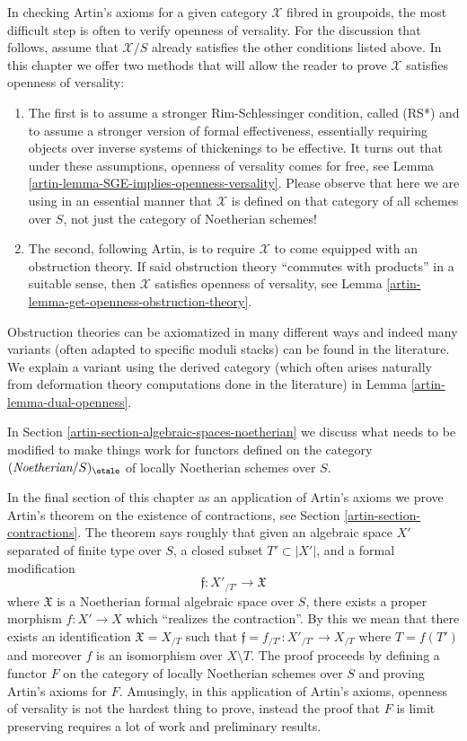\medskip\noindent
In checking Artin's axioms for a given category $\mathcal{X}$ fibred
in groupoids, the most difficult step is often to verify openness
of versality. For the discussion that follows, assume that $\mathcal{X}/S$
already satisfies the other conditions listed above.
In this chapter we offer two methods that will allow the reader
to prove $\mathcal{X}$ satisfies openness of versality:
\begin{enumerate}
\item The first is to assume a stronger Rim-Schlessinger
condition, called (RS*) and to assume a stronger version of
formal effectiveness, essentially requiring objects over
inverse systems of thickenings to be effective. It turns out
that under these assumptions, openness of versality comes for
free, see Lemma \ref{artin-lemma-SGE-implies-openness-versality}.
Please observe that here we are using in an essential manner
that $\mathcal{X}$ is defined on that category of all schemes
over $S$, not just the category of Noetherian schemes!
\item The second, following Artin, is to require $\mathcal{X}$
to come equipped with an obstruction theory. If said obstruction
theory ``commutes with products'' in a suitable sense, then
$\mathcal{X}$ satisfies openness of versality, see
Lemma \ref{artin-lemma-get-openness-obstruction-theory}.
\end{enumerate}
Obstruction theories can be axiomatized in many different ways
and indeed many variants (often adapted to specific moduli stacks)
can be found in the literature. We explain a variant using the derived category
(which often arises naturally from deformation theory computations
done in the literature) in Lemma \ref{artin-lemma-dual-openness}.

\medskip\noindent
In Section \ref{artin-section-algebraic-spaces-noetherian}
we discuss what needs to be modified to make
things work for functors defined on the category
$(\textit{Noetherian}/S)_\etale$ of locally Noetherian
schemes over $S$.

\medskip\noindent
In the final section of this chapter as an application of Artin's axioms
we prove Artin's theorem on the existence of contractions, see
Section \ref{artin-section-contractions}. The theorem says roughly that given an
algebraic space $X'$ separated of finite type over $S$,
a closed subset $T' \subset |X'|$, and a formal modification
$$
\mathfrak{f} : X'_{/T'} \longrightarrow \mathfrak{X}
$$
where $\mathfrak{X}$ is a Noetherian formal algebraic space over $S$,
there exists a proper morphism $f : X' \to X$ which
``realizes the contraction''. By this we mean that there exists an
identification $\mathfrak{X} = X_{/T}$ such that
$\mathfrak{f} = f_{/T'} : X'_{/T'} \to X_{/T}$ where $T = f(T')$
and moreover $f$ is an isomorphism over $X \setminus T$. The proof proceeds
by defining a functor $F$ on the category of locally Noetherian schemes
over $S$ and proving Artin's axioms for $F$. Amusingly, in this
application of Artin's axioms, openness of versality is not the hardest
thing to prove, instead the proof that $F$ is limit preserving requires
a lot of work and preliminary results.

